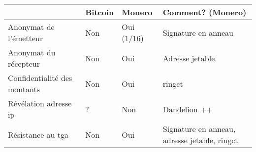 \begin{table}[!ht]
    \centering
    \begin{tabular}{|l|l|l|l|}
    \hline
        ~ & Bitcoin & Monero & Comment? (Monero) \\ \hline
        Anonymat de l'émetteur & Non & Oui (1/16) & Signature en anneau \\ \hline
        Anonymat du récepteur & Non & Oui & Adresse jetable \\ \hline
        Confidentialité des montants & Non & Oui & \acrshort{ringct} \\ \hline
        Révélation adresse \acrshort{ip} & ? & Non & Dandelion ++ \\ \hline
        Résistance au \acrshort{tga} & Non & Oui & Signature en anneau, adresse jetable, \acrshort{ringct} \\ \hline
    \end{tabular}
\end{table}